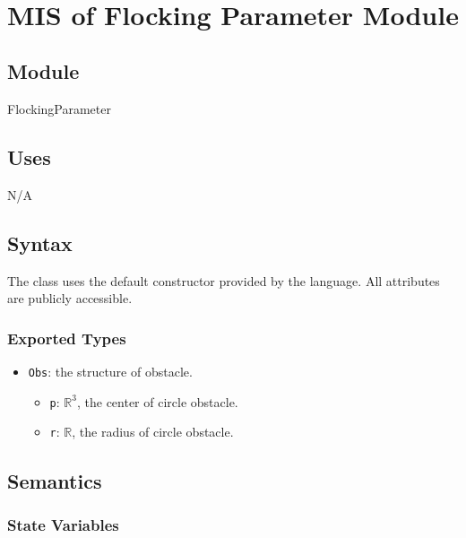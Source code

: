 \documentclass[12pt, titlepage]{article}
\begin{document}
~\newpage

\section{MIS of Flocking Parameter Module} \label{mFP}

\subsection{Module}

FlockingParameter

\subsection{Uses}

N/A

\subsection{Syntax}

The class uses the default constructor provided by the language. All 
attributes are publicly accessible.

\subsubsection{Exported Types}

\begin{itemize}
\item \texttt{Obs}: the structure of obstacle.
\begin{itemize}
  \item \texttt{p}: $\mathbb{R}^3$, the center of circle obstacle.
  \item \texttt{r}: $\mathbb{R}$, the radius of circle obstacle.
\end{itemize}
\end{itemize}

\subsection{Semantics}

\subsubsection{State Variables}
\end{document}
